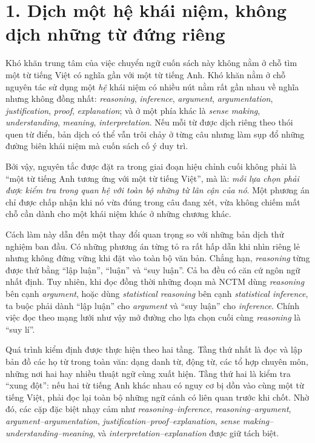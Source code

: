 \clearpage

\section*{1. Dịch một hệ khái niệm, không dịch những từ đứng riêng}

Khó khăn trung tâm của việc chuyển ngữ cuốn sách này không nằm ở chỗ tìm một từ tiếng Việt có nghĩa gần với một từ tiếng Anh. Khó khăn nằm ở chỗ nguyên tác sử dụng một \emph{hệ} khái niệm có nhiều nút nằm rất gần nhau về nghĩa nhưng không đồng nhất: \emph{reasoning}, \emph{inference}, \emph{argument}, \emph{argumentation}, \emph{justification}, \emph{proof}, \emph{explanation}; và ở một phía khác là \emph{sense making}, \emph{understanding}, \emph{meaning}, \emph{interpretation}. Nếu mỗi từ được dịch riêng theo thói quen từ điển, bản dịch có thể vẫn trôi chảy ở từng câu nhưng làm sụp đổ những đường biên khái niệm mà cuốn sách cố ý duy trì.

Bởi vậy, nguyên tắc được đặt ra trong giai đoạn hiệu chỉnh cuối không phải là ``một từ tiếng Anh tương ứng với một từ tiếng Việt'', mà là: \emph{mỗi lựa chọn phải được kiểm tra trong quan hệ với toàn bộ những từ lân cận của nó}. Một phương án chỉ được chấp nhận khi nó vừa đúng trong câu đang xét, vừa không chiếm mất chỗ cần dành cho một khái niệm khác ở những chương khác.

Cách làm này dẫn đến một thay đổi quan trọng so với những bản dịch thử nghiệm ban đầu. Có những phương án từng tỏ ra rất hấp dẫn khi nhìn riêng lẻ nhưng không đứng vững khi đặt vào toàn bộ văn bản. Chẳng hạn, \emph{reasoning} từng được thử bằng ``lập luận'', ``luận'' và ``suy luận''. Cả ba đều có căn cứ ngôn ngữ nhất định. Tuy nhiên, khi đọc đồng thời những đoạn mà NCTM dùng \emph{reasoning} bên cạnh \emph{argument}, hoặc dùng \emph{statistical reasoning} bên cạnh \emph{statistical inference}, ta buộc phải dành ``lập luận'' cho \emph{argument} và ``suy luận'' cho \emph{inference}. Chính việc đọc theo mạng lưới như vậy mở đường cho lựa chọn cuối cùng \emph{reasoning} là ``suy lí''.

Quá trình kiểm định được thực hiện theo hai tầng. Tầng thứ nhất là đọc và lập bản đồ các họ từ trong toàn văn: dạng danh từ, động từ, các tổ hợp chuyên môn, những nơi hai hay nhiều thuật ngữ cùng xuất hiện. Tầng thứ hai là kiểm tra ``xung đột'': nếu hai từ tiếng Anh khác nhau có nguy cơ bị dồn vào cùng một từ tiếng Việt, phải đọc lại toàn bộ những ngữ cảnh có liên quan trước khi chốt. Nhờ đó, các cặp đặc biệt nhạy cảm như \emph{reasoning--inference}, \emph{reasoning--argument}, \emph{argument--argumentation}, \emph{justification--proof--explanation}, \emph{sense making--understanding--meaning}, và \emph{interpretation--explanation} được giữ tách biệt.

